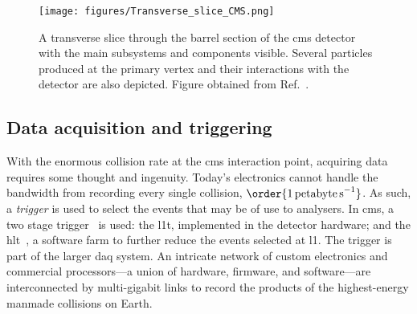 \begin{figure}[htbp]
    \centering
    \texttt{[image: figures/Transverse\_slice\_CMS.png]}
    \caption[A transverse slice through the barrel section of the CMS detector with the main subsystems and components visible]{A transverse slice through the barrel section of the \acrshort{cms} detector with the main subsystems and components visible. Several particles produced at the primary vertex and their interactions with the detector are also depicted. Figure obtained from Ref.~.}
    \label{fig:detector_cms_transverse}
\end{figure}





\subsection{Data acquisition and triggering}
\label{subsec:cms_recording_data}

With the enormous collision rate at the \acrshort{cms} interaction point, acquiring data requires some thought and ingenuity. Today's electronics cannot handle the bandwidth from recording every single collision, $\order{\text{1\,petabyte\,s}^{-1}}$. As such, a \emph{trigger} is used to select the events that may be of use to analysers. In \acrshort{cms}, a two stage trigger~\cite{Bayatyan:706847} is used: the \acrfull{l1t}, implemented in the detector hardware; and the \acrfull{hlt}~\cite{Cittolin:578006}, a software farm to further reduce the events selected at \acrlong{l1}. The trigger is part of the larger \acrfull{daq} system. An intricate network of custom electronics and commercial processors---a union of hardware, firmware, and software---are interconnected by multi-gigabit links to record the products of the highest-energy manmade collisions on Earth.




